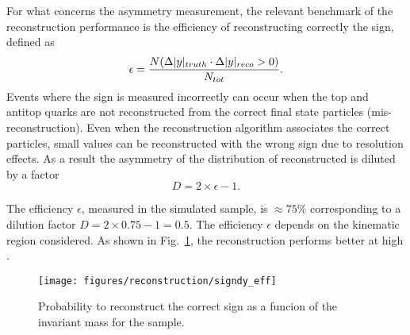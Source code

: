 For what concerns the asymmetry measurement, the relevant benchmark of
the reconstruction performance is the efficiency of reconstructing
correctly the \dy{} sign, defined as
\begin{equation}
  \label{eq:dysign}
  \epsilon = \frac{N(\Delta|y|{}_{truth}\cdot\Delta|y|{}_{reco}>0)}{N_{tot}}.
\end{equation}
Events where the \dy{} sign is measured incorrectly can occur when the top and
antitop quarks are not reconstructed from the correct final
state particles (mis-reconstruction). Even when the reconstruction
algorithm associates the correct particles, small \dy{} values can be
reconstructed with the wrong sign due to resolution effects.
As a result the asymmetry of the distribution of reconstructed \dy{}
is diluted by a factor 
\begin{equation}
  \label{eq:dilution}
D = 2\times{}\epsilon - 1.
\end{equation}  

The efficiency $\epsilon$, measured in the \ttbar{} simulated sample,
is $\approx75\%$ corresponding to a dilution factor
$D=2\times0.75-1=0.5$.
The efficiency $\epsilon$ depends on the kinematic region
considered. As shown in Fig.~\ref{fig:dysign}, the \dy{} reconstruction performs
better at high \mtt{}. 

\begin{figure}[!htb]\centering
  \texttt{[image: figures/reconstruction/signdy\_eff]}
  \caption{
    \label{fig:dysign}
    Probability to reconstruct the correct \dy{} sign as a funcion of
    the \ttbar{} invariant mass \mtt{} for the \mujets{} sample.
  }
\end{figure}

%

